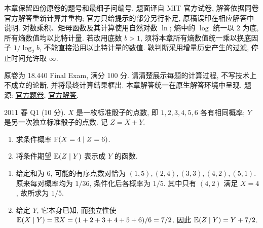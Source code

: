 本章保留四份原卷的题号和最细子问编号. 题面译自 MIT 官方试卷, 解答依据同卷官方解答重新计算并重构; 官方只给提示的部分另行补足, 原稿误印在相应解答中说明. 对数乘积、矩母函数及其计算使用自然对数 $\ln$; 熵中的 $\log$ 统一以 $2$ 为底, 所有熵数值均以比特计量. 若改用底数 $b>1$, 须将本章所有熵数值统一乘以换底因子 $1/\log_2 b$, 不能直接沿用以比特计量的数值. 鞅判断采用增量历史产生的过滤, 停止时间允许取 $\infty$.

原卷为 18.440 Final Exam, 满分 100 分. 请清楚展示每题的计算过程, 不写技术上不成立的论断, 并将最终计算结果框出. 本章解答统一在原生解答环境中呈现.
题源: \href{https://ocw.mit.edu/courses/18-600-probability-and-random-variables-fall-2019/resources/mit18_600f19_final_2011/}{官方题卷}, \href{https://ocw.mit.edu/courses/18-600-probability-and-random-variables-fall-2019/resources/mit18_600f19_final_2011_soln/}{官方解答}.

\begin{exercise}\label{ex:fe2011q1}
2011 春 Q1 (10 分). $X$ 是一枚标准骰子的点数, 即 $1,2,3,4,5,6$ 各有相同概率; $Y$ 是另一次独立标准骰子的点数. 记 $Z=X+Y$.
\begin{enumerate}[label=\arabic*.]
\item\label{ex:fe2011q1-1} 求条件概率 $\mathbb P(X=4\mid Z=6)$.
\item\label{ex:fe2011q1-2} 将条件期望 $\mathbb E(Z\mid Y)$ 表示成 $Y$ 的函数.
\end{enumerate}
\end{exercise}
\begin{solution}
\begin{enumerate}[label=\arabic*.]
\item\label{sol:fe2011q1-1} 给定和为 $6$, 可能的有序点数对恰为 $(1,5),(2,4),(3,3),(4,2),(5,1)$. 原来每对概率均为 $1/36$, 条件化后各概率为 $1/5$. 其中只有 $(4,2)$ 满足 $X=4$, 故所求为 $1/5$.
\item\label{sol:fe2011q1-2} 给定 $Y$, 它本身已知, 而独立性使 $\mathbb E(X\mid Y)=\mathbb E X=(1+2+3+4+5+6)/6=7/2$. 因此 $\mathbb E(Z\mid Y)=Y+7/2$.\qedhere
\end{enumerate}
\end{solution}


